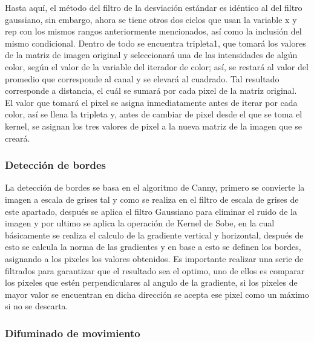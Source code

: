 \documentclass[11pt]{article}
\begin{document}
Hasta aquí, el método del filtro de la desviación estándar es idéntico al del filtro gaussiano, sin embargo, ahora se tiene otros dos ciclos que usan la variable x y rep con los mismos rangos anteriormente mencionados, así como la inclusión del mismo condicional. Dentro de todo se encuentra tripleta1, que tomará los valores de la matriz de imagen original y seleccionará una de las intensidades de algún color, según el valor de la variable del iterador de color; así, se restará al valor del promedio que corresponde al canal y se elevará al cuadrado. Tal resultado corresponde a distancia, el cuál se sumará por cada pixel de la matriz original.\\

El valor que tomará el pixel se asigna inmediatamente antes de iterar por cada color, así se llena la tripleta y, antes de cambiar de pixel desde el que se toma el kernel, se asignan los tres valores de pixel a la nueva matriz de la imagen que se creará.


\subsubsection{Detección de bordes}
La detección de bordes se basa en el algoritmo de Canny, primero se convierte la imagen a escala de grises tal y como se realiza en el filtro de escala de grises de este apartado, después se aplica el filtro Gaussiano para eliminar el ruido de la imagen y por ultimo se aplica la operación de Kernel de Sobe, en la cual básicamente se realiza el calculo de la gradiente vertical y horizontal, después de esto se calcula la norma de las gradientes y en base a esto se definen los bordes, asignando a los pixeles los valores obtenidos. Es importante realizar una serie de filtrados para garantizar que el resultado sea el optimo, uno de ellos es comparar los pixeles que estén perpendiculares al angulo de la gradiente, si los pixeles de mayor valor se encuentran en dicha dirección se acepta ese pixel como un máximo si no se descarta.

\subsubsection{Difuminado de movimiento}\\
\end{document}

